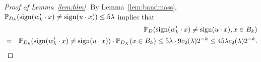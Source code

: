 \begin{proof}[Proof of Lemma~\ref{lem:hlm}]






By Lemma~\ref{lem:bandmass}, $\mathbb{P}_{D_k}(\operatorname{sign}(w_k' \cdot x) \neq \operatorname{sign}(u \cdot x)) \leq 5\lambda$ implies that
 \begin{eqnarray}
	 &&\mathbb{P}_{D}(\operatorname{sign}(w_k' \cdot x) \neq \operatorname{sign}(u \cdot x), x \in B_k) \nonumber \\
	 &=& \mathbb{P}_{D_k}(\operatorname{sign}(w_k' \cdot x) \neq \operatorname{sign}(u \cdot x)) \cdot \mathbb{P}_{D_X}(x \in B_k) \leq 5 \lambda \cdot 9 c_2(\lambda) 2^{-k} \leq 45 \lambda c_2(\lambda) 2^{-k}.
	 \label{eqn:inband}
\end{eqnarray}


\end{proof}
